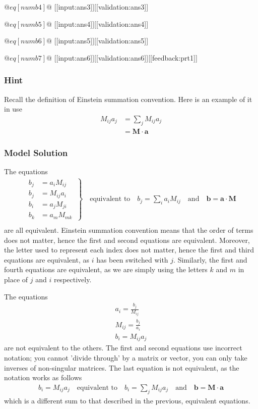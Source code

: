 \documentclass[a4paper,10pt]{article}
\begin{document}
\( @eq[numb4]@ \)   [[input:ans3]][[validation:ans3]]

\( @eq[numb5]@ \)   [[input:ans4]][[validation:ans4]]

\( @eq[numb6]@ \)   [[input:ans5]][[validation:ans5]]

\( @eq[numb7]@ \)   [[input:ans6]][[validation:ans6]][[feedback:prt1]]
\subsubsection{Hint}
Recall the definition of Einstein summation convention. Here is an example of it in use \begin{align*} M_{ij}a_j &= \sum_{j} M_{ij} a_j \\ &= \textbf{M} \cdot \textbf{a} \end{align*}
\subsubsection{Model Solution}
The equations \begin{align*} \left. \begin{aligned} b_j &= a_i M_{ij} \quad \\ b_j &= M_{ij} a_i \\ b_i &= a_j M_{ji} \\ b_k &= a_m M_{mk} \end{aligned} \right\} \quad \text{equivalent to} \quad b_j = \sum_i a_i M_{ij} \quad\text{and} \quad \textbf{b} = \textbf{a} \cdot \textbf{M} \\ \end{align*} are all equivalent. Einstein summation convention means that the order of terms does not matter, hence the first and second equations are equivalent. Moreover, the letter used to represent each index does not matter, hence the first and third equations are equivalent, as \(i\) has been switched with \(j\). Similarly, the first and fourth equations are equivalent, as we are simply using the letters \(k\) and \(m\) in place of \(j\) and \(i\) respectively.

The equations \begin{align*} a_i = \frac{b_j}{M_{ij}} \\ M_{ij} = \frac{b_j}{a_i} \\ b_i = M_{ij} a_j \end{align*} are not equivalent to the others. The first and second equations use incorrect notation; you cannot 'divide through' by a matrix or vector, you can only take inverses of non-singular matrices. The last equation is not equivalent, as the notation works as follows \begin{align*} b_i = M_{ij} a_j \quad \text{equivalent to} \quad b_i = \sum_j M_{ij} a_j \quad \text{and} \quad \textbf{b} = \textbf{M} \cdot \textbf{a} \end{align*} which is a different sum to that described in the previous, equivalent equations.
\end{document}
